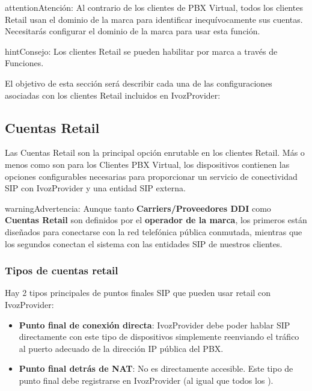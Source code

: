 \documentclass[letterpaper,10pt,spanish]{sphinxmanual}
\begin{document}
\begin{notice}{attention}{Atención:}
Al contrario de los clientes de PBX Virtual, todos los clientes Retail usan el dominio de la marca para identificar inequívocamente sus cuentas. Necesitarás configurar el dominio de la marca para usar esta función.
\end{notice}

\begin{notice}{hint}{Consejo:}
Los clientes Retail se pueden habilitar por marca a través de Funciones.
\end{notice}

El objetivo de esta sección será describir cada una de las configuraciones asociadas con los clientes Retail incluidos en IvozProvider:


\subsection{Cuentas Retail}
\label{administration_portal/client/retail/retail_accounts::doc}\label{administration_portal/client/retail/retail_accounts:retail-accounts}\label{administration_portal/client/retail/retail_accounts:id1}
Las Cuentas Retail son la principal opción enrutable en los clientes Retail. Más o menos como {\hyperref[administration_portal/client/vpbx/routing_endpoints/friends/index:friends]{}} son para los Clientes PBX Virtual, los dispositivos contienen las opciones configurables necesarias para proporcionar un servicio de conectividad SIP con IvozProvider y una entidad SIP externa.

\begin{notice}{warning}{Advertencia:}
Aunque tanto \textbf{Carriers/Proveedores DDI} como \textbf{Cuentas Retail} son definidos por el \textbf{operador de la marca}, los primeros están diseñados para conectarse con la red telefónica pública conmutada, mientras que los segundos conectan el sistema con las entidades SIP de nuestros clientes.
\end{notice}


\subsubsection{Tipos de cuentas retail}
\label{administration_portal/client/retail/retail_accounts:types-of-retail-accounts}
Hay 2 tipos principales de puntos finales SIP que pueden usar retail con IvozProvider:
\begin{itemize}
\item {} 
\textbf{Punto final de conexión directa}: IvozProvider debe poder hablar SIP directamente con este tipo de dispositivos simplemente reenviando el tráfico al puerto adecuado de la dirección IP pública del PBX.

\item {} 
\textbf{Punto final detrás de NAT}: No es directamente accesible. Este tipo de punto final debe registrarse en IvozProvider (al igual que todos los {\hyperref[administration_portal/client/vpbx/terminals:terminals]{}}).

\end{itemize}
\end{document}
